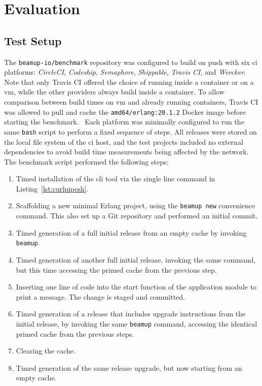 \cleardoublepage
\section{Evaluation}


\subsection{Test Setup}
The \lstinline|beamup-io/benchmark| repository was configured to build on push with six \acrfull{ci} platforms: \emph{CircleCI}, \emph{Codeship}, \emph{Semaphore}, \emph{Shippable}, \emph{Travis CI}, and \emph{Wercker}. Note that only Travis CI offered the choice of running inside a container or on a \acrshort{vm}, while the other providers always build inside a container. To allow comparison between build times on \acrshort{vm} and already running containers, Travis CI was allowed to pull and cache the \lstinline|amd64/erlang:20.1.2| Docker image before starting the benchmark.~\cite{docker:erlang} Each platform was minimally configured to run the same \lstinline|bash| script to perform a fixed sequence of steps. All releases were stored on the local file system of the \acrshort{ci} host, and the test projects included no external dependencies to avoid build time measurements being affected by the network. The benchmark script performed the following steps:

\begin{enumerate}
  \item Timed installation of the \acrshort{cli} tool via the single line command in Listing~\ref{lst:curlpipesh}.
  \item Scaffolding a new minimal Erlang project, using the \lstinline|beamup new| convenience command. This also set up a Git repository and performed an initial commit.
  \item Timed generation of a full initial release from an empty cache by invoking \lstinline|beamup|.
  \item Timed generation of another full initial release, invoking the same command, but this time accessing the primed cache from the previous step.
  \item Inserting one line of code into the start function of the application module to print a message. The change is staged and committed.
  \item Timed generation of a release that includes upgrade instructions from the initial release, by invoking the same \lstinline|beamup| command, accessing the identical primed cache from the previous steps.
  \item Clearing the cache.
  \item Timed generation of the same release upgrade, but now starting from an empty cache.
\end{enumerate}

